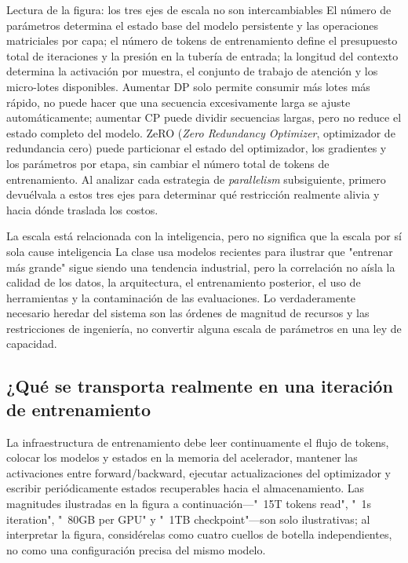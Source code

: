 \begin{knowledgebox}{Lectura de la figura: los tres ejes de escala no son intercambiables}
El número de parámetros determina el estado base del modelo persistente y las operaciones matriciales por capa; el número de tokens de entrenamiento define el presupuesto total de iteraciones y la presión en la tubería de entrada; la longitud del contexto determina la activación por muestra, el conjunto de trabajo de atención y los micro-lotes disponibles. Aumentar DP solo permite consumir más lotes más rápido, no puede hacer que una secuencia excesivamente larga se ajuste automáticamente; aumentar CP puede dividir secuencias largas, pero no reduce el estado completo del modelo. ZeRO (\textit{Zero Redundancy Optimizer}, optimizador de redundancia cero) puede particionar el estado del optimizador, los gradientes y los parámetros por etapa, sin cambiar el número total de tokens de entrenamiento. Al analizar cada estrategia de \textit{parallelism} subsiguiente, primero devuélvala a estos tres ejes para determinar qué restricción realmente alivia y hacia dónde traslada los costos.
\end{knowledgebox}


\begin{warningbox}{La escala está relacionada con la inteligencia, pero no significa que la escala por sí sola cause inteligencia}
La clase usa modelos recientes para ilustrar que "entrenar más grande" sigue siendo una tendencia industrial, pero la correlación no aísla la calidad de los datos, la arquitectura, el entrenamiento posterior, el uso de herramientas y la contaminación de las evaluaciones. Lo verdaderamente necesario heredar del sistema son las órdenes de magnitud de recursos y las restricciones de ingeniería, no convertir alguna escala de parámetros en una ley de capacidad.
\end{warningbox}

\subsection{¿Qué se transporta realmente en una iteración de entrenamiento}

La infraestructura de entrenamiento debe leer continuamente el flujo de tokens, colocar los modelos y estados en la memoria del acelerador, mantener las activaciones entre forward/backward, ejecutar actualizaciones del optimizador y escribir periódicamente estados recuperables hacia el almacenamiento. Las magnitudes ilustradas en la figura a continuación—"~15T tokens read", "~1s iteration", "~80GB per GPU" y "~1TB checkpoint"—son solo ilustrativas; al interpretar la figura, considérelas como cuatro cuellos de botella independientes, no como una configuración precisa del mismo modelo.

